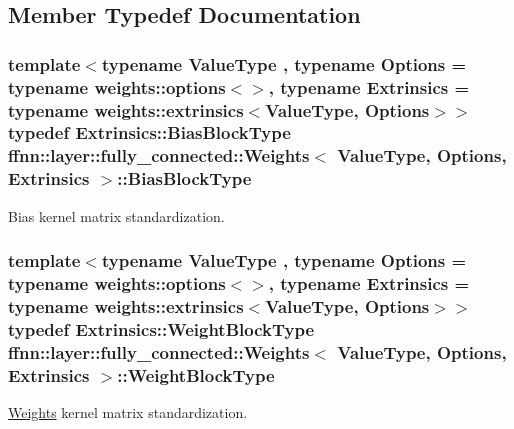 \subsection{Member Typedef Documentation}
\hypertarget{classffnn_1_1layer_1_1fully__connected_1_1_weights_a6f5ad97bf46dac9d55752b5117768957}{
\subsubsection[{Bias\-Block\-Type}]{\setlength{\rightskip}{0pt plus 5cm}template$<$typename Value\-Type , typename Options  = typename weights\-::options$<$$>$, typename Extrinsics  = typename weights\-::extrinsics$<$\-Value\-Type, Options$>$$>$ typedef Extrinsics\-::\-Bias\-Block\-Type {\bf ffnn\-::layer\-::fully\-\_\-connected\-::\-Weights}$<$ Value\-Type, Options, Extrinsics $>$\-::{\bf Bias\-Block\-Type}}}\label{classffnn_1_1layer_1_1fully__connected_1_1_weights_a6f5ad97bf46dac9d55752b5117768957}


Bias kernel matrix standardization. 

\hypertarget{classffnn_1_1layer_1_1fully__connected_1_1_weights_a60cdcf8a80260e8558f1e64f8a0a8218}{
\subsubsection[{Weight\-Block\-Type}]{\setlength{\rightskip}{0pt plus 5cm}template$<$typename Value\-Type , typename Options  = typename weights\-::options$<$$>$, typename Extrinsics  = typename weights\-::extrinsics$<$\-Value\-Type, Options$>$$>$ typedef Extrinsics\-::\-Weight\-Block\-Type {\bf ffnn\-::layer\-::fully\-\_\-connected\-::\-Weights}$<$ Value\-Type, Options, Extrinsics $>$\-::{\bf Weight\-Block\-Type}}}\label{classffnn_1_1layer_1_1fully__connected_1_1_weights_a60cdcf8a80260e8558f1e64f8a0a8218}


\hyperlink{classffnn_1_1layer_1_1fully__connected_1_1_weights}{Weights} kernel matrix standardization. 



